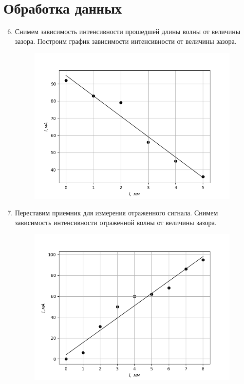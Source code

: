\documentclass[14pt, a4paper]{report}
\begin{document}
\section{Обработка данных}

\begin{enumerate}

\setcounter{enumi}{5}

\item Снимем зависимость интенсивности прошедшей длины волны от величины зазора. Построим график зависимости интенсивности от величины зазора.

\begin{figure}[H]
\centering
\includegraphics[scale=0.5]{../images/462_1.png}
\end{figure}

\item Переставим приемник для измерения отраженного сигнала. Снимем зависимость интенсивности отраженной волны от величины зазора.

\begin{figure}[H]
\centering
\includegraphics[scale=0.5]{../images/462_2.png}
\end{figure}


\end{enumerate}
\end{document}
